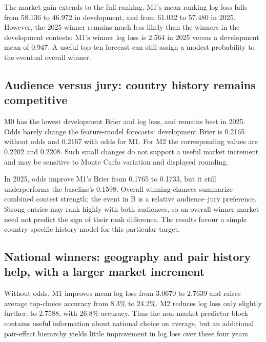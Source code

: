 \documentclass[11pt,a4paper]{article}
\begin{document}
\begin{table}[H]\centering\small
\caption{Task A beyond top-ten membership: negative log posterior-predictive probability of the complete ranking and of the overall winner. Each final contributes one score. Lower is better. The last column is the probability assigned to Austria, the 2025 winner.}\label{tab:Aranking}

\end{table}
The market gain extends to the full ranking. M1's mean ranking log loss falls from 58.136 to 46.972 in development, and from 61.032 to 57.480 in 2025. However, the 2025 winner remains much less likely than the winners in the development contests: M1's winner log loss is 2.564 in 2025 versus a development mean of 0.947. A useful top-ten forecast can still assign a modest probability to the eventual overall winner.

\subsection{Audience versus jury: country history remains competitive}
\begin{table}[H]\centering\small
\caption{Task B: probability that the audience rank is better than the jury rank.}\label{tab:B}

\end{table}
M0 has the lowest development Brier and log loss, and remains best in 2025. Odds barely change the feature-model forecasts: development Brier is 0.2165 without odds and 0.2167 with odds for M1. For M2 the corresponding values are 0.2202 and 0.2208. Such small changes do not support a useful market increment and may be sensitive to Monte Carlo variation and displayed rounding.

In 2025, odds improve M1's Brier from 0.1765 to 0.1733, but it still underperforms the baseline's 0.1598. Overall winning chances summarize combined contest strength; the event in B is a relative audience--jury preference. Strong entries may rank highly with both audiences, so an overall-winner market need not predict the sign of their rank difference. The results favour a simple country-specific history model for this particular target.

\subsection{National winners: geography and pair history help, with a larger market increment}
\begin{table}[H]\centering\small
\caption{Task C: losses for complete national-winner distributions. Brier is summed over candidates before averaging over votes.}\label{tab:C}

\end{table}
Without odds, M1 improves mean log loss from 3.0670 to 2.7639 and raises average top-choice accuracy from 8.3\% to 24.2\%. M2 reduces log loss only slightly further, to 2.7588, with 26.8\% accuracy. Thus the non-market predictor block contains useful information about national choice on average, but an additional pair-effect hierarchy yields little improvement in log loss over these four years.
\end{document}
